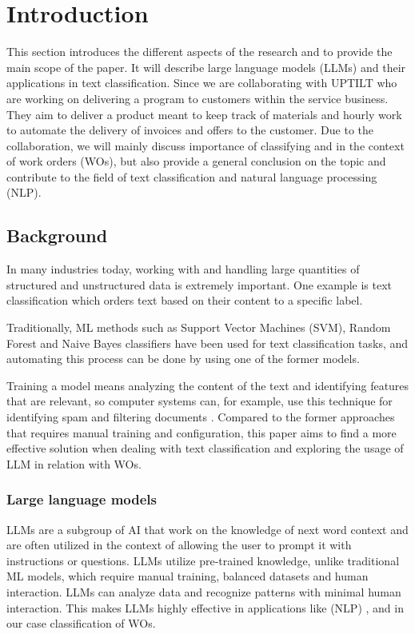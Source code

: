 \section{Introduction}

This section introduces the different aspects of the research and to provide the
main scope of the paper.
It will describe large language models (LLMs) and their applications in text
classification.
Since we are collaborating with UPTILT who are working on delivering a program
to customers within the service
business.
They aim to deliver a product meant to keep track of materials and hourly work
to automate the delivery of invoices and offers to the customer.
Due to the collaboration, we will mainly discuss importance of classifying
and in the context of work orders (WOs), but also provide a general conclusion
on the topic and contribute to the field of text classification and natural
language processing (NLP).

\subsection{Background}

In many industries today, working with and handling large quantities of
structured and unstructured data is extremely important.
One example is text classification which orders text based on their content to a
specific label.

Traditionally, ML methods such as Support Vector Machines (SVM), Random Forest
and Naive Bayes classifiers have been used for text classification tasks,
and automating this process can be done by using one of the former models.

Training a model means analyzing the content of the text and identifying
features that are relevant, so computer systems can, for example, use this
technique for identifying spam and filtering documents \cite{dalal2011}.
Compared to the former approaches that requires manual training and configuration,
this paper aims to find a more effective solution when dealing with text classification
and exploring the usage of LLM in relation with WOs.

\subsubsection{Large language models}

LLMs are a subgroup of AI that work on the knowledge of next word context and are often utilized
in the context of allowing the user to prompt it with instructions or questions.
LLMs utilize pre-trained knowledge, unlike traditional ML models, which require manual training,
balanced datasets and human interaction.
LLMs can analyze data and recognize patterns with minimal human interaction.
This makes LLMs highly effective in applications like (NLP) \cite{andersson2024},
and in our case classification of WOs.

